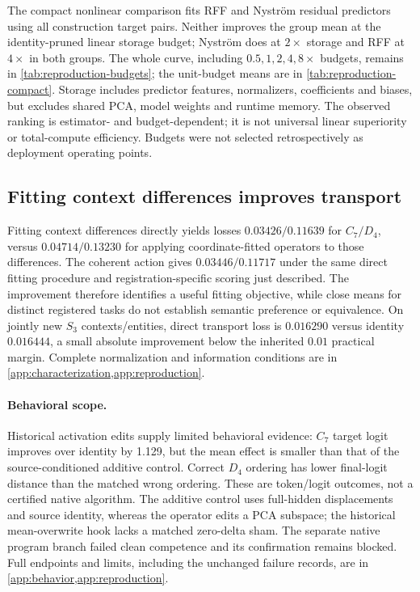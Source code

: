 \documentclass{article}
\begin{document}
The compact nonlinear comparison fits RFF and Nystr\"om residual predictors using all construction target pairs. Neither improves the group mean at the identity-pruned linear storage budget; Nystr\"om does at $2\times$ storage and RFF at $4\times$ in both groups. The whole curve, including $0.5,1,2,4,8\times$ budgets, remains in \cref{tab:reproduction-budgets}; the unit-budget means are in \cref{tab:reproduction-compact}. Storage includes predictor features, normalizers, coefficients and biases, but excludes shared PCA, model weights and runtime memory. The observed ranking is estimator- and budget-dependent; it is not universal linear superiority or total-compute efficiency. Budgets were not selected retrospectively as deployment operating points.

\subsection{Fitting context differences improves transport}
Fitting context differences directly yields losses $0.03426/0.11639$ for $C_7/D_4$, versus $0.04714/0.13230$ for applying coordinate-fitted operators to those differences. The coherent action gives $0.03446/0.11717$ under the same direct fitting procedure and registration-specific scoring just described. The improvement therefore identifies a useful fitting objective, while close means for distinct registered tasks do not establish semantic preference or equivalence. On jointly new $S_3$ contexts/entities, direct transport loss is $0.016290$ versus identity $0.016444$, a small absolute improvement below the inherited $0.01$ practical margin. Complete normalization and information conditions are in \cref{app:characterization,app:reproduction}.

\paragraph{Behavioral scope.}
Historical activation edits supply limited behavioral evidence: $C_7$ target logit improves over identity by 1.129, but the mean effect is smaller than that of the source-conditioned additive control. Correct $D_4$ ordering has lower final-logit distance than the matched wrong ordering. These are token/logit outcomes, not a certified native algorithm. The additive control uses full-hidden displacements and source identity, whereas the operator edits a PCA subspace; the historical mean-overwrite hook lacks a matched zero-delta sham. The separate native program branch failed clean competence and its confirmation remains blocked. Full endpoints and limits, including the unchanged failure records, are in \cref{app:behavior,app:reproduction}.
\end{document}
